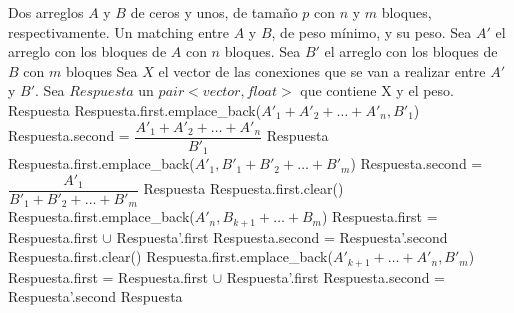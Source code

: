 \documentclass[12pt,a4,paper]{article}
\begin{document}
\begin{algorithmic}[1]
    \REQUIRE Dos arreglos $A$ y $B$ de ceros y unos, de tamaño $p$ con $n$ y $m$ bloques, respectivamente.
    \ENSURE Un matching entre $A$ y $B$, de peso mínimo, y su peso. \newline \newline
        \STATE Sea $A'$ el arreglo con los bloques de $A$ con $n$ bloques.
        \STATE Sea $B'$ el arreglo con los bloques de $B$ con $m$ bloques
        \STATE Sea $X$ el vector de las conexiones que se van a realizar entre $A'$ y $B'$.
        \STATE Sea $Respuesta$ un $pair<vector, float>$ que contiene X y el peso.
            \RETURN Respuesta
        \ENDIF
        \STATE
            \STATE Respuesta.first.emplace\_back($A'_1+A'_2+\ldots +A'_n, B'_1$)
            \STATE Respuesta.second = $\dfrac{A'_1+A'_2+\ldots +A'_n}{B'_1}$
            \RETURN Respuesta
        \ENDIF
        \STATE
            \STATE Respuesta.first.emplace\_back($A'_1, B'_1+B'_2+\ldots +B'_m$)
            \STATE Respuesta.second = $\dfrac{A'_1}{B'_1+B'_2+\ldots +B'_m}$
            \RETURN Respuesta
        \ENDIF
        \STATE
         
             
                \STATE Respuesta.first.clear()
                \STATE Respuesta.first.emplace\_back($A'_n, B_{k+1}+\ldots+B_m$)
                \STATE Respuesta.first = Respuesta.first $\cup$ Respuesta'.first
                \STATE Respuesta.second = Respuesta'.second
            \ENDIF
        \ENDFOR
        \STATE
         
             
                \STATE Respuesta.first.clear()
                \STATE Respuesta.first.emplace\_back($A'_{k+1} + \ldots + A'_n, B'_m$)
                \STATE Respuesta.first = Respuesta.first $\cup$  Respuesta'.first
                \STATE Respuesta.second = Respuesta'.second
            \ENDIF
        \ENDFOR
        \STATE
        \RETURN Respuesta
\end{algorithmic}
\end{document}
